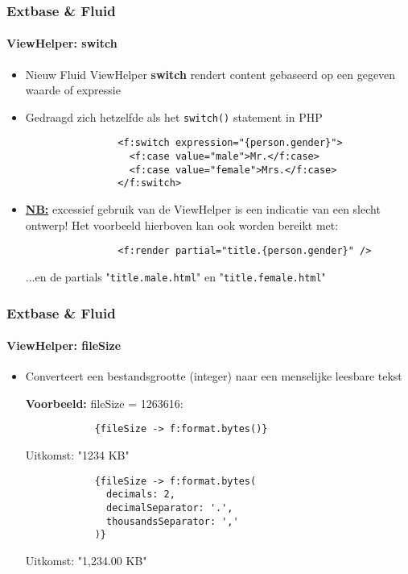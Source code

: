 \begin{frame}[fragile]
	\frametitle{Extbase \& Fluid}
	\framesubtitle{ViewHelper: switch}

	\lstset{
		basicstyle=\smaller\ttfamily
	}

	\begin{itemize}
		\item Nieuw Fluid ViewHelper \textbf{switch} rendert content gebaseerd op een gegeven waarde of expressie
		\item Gedraagd zich hetzelfde als het \texttt{switch()} statement in PHP

			\begin{lstlisting}
				<f:switch expression="{person.gender}">
				  <f:case value="male">Mr.</f:case>
				  <f:case value="female">Mrs.</f:case>
				</f:switch>
			\end{lstlisting}

		\item \textbf{\underline{NB:}} excessief gebruik van de ViewHelper is een indicatie van een slecht ontwerp! Het voorbeeld hierboven kan ook worden bereikt met:

			\begin{lstlisting}
				<f:render partial="title.{person.gender}" />
			\end{lstlisting}

			...en de partials "\texttt{title.male.html}" en "\texttt{title.female.html}"

	\end{itemize}

\end{frame}


\begin{frame}[fragile]
	\frametitle{Extbase \& Fluid}
	\framesubtitle{ViewHelper: fileSize}

	\lstset{
		basicstyle=\smaller\ttfamily
	}

	\begin{itemize}
		\item Converteert een bestandsgrootte (integer) naar een menselijke leesbare tekst\newline

			\smaller\textbf{Voorbeeld:} fileSize = 1263616:\normalsize
			\begin{lstlisting}
			{fileSize -> f:format.bytes()}
			\end{lstlisting}
			\smaller Uitkomst: "1234 KB"\normalsize\newline
			\begin{lstlisting}
			{fileSize -> f:format.bytes(
			  decimals: 2,
			  decimalSeparator: '.',
			  thousandsSeparator: ','
			)}
			\end{lstlisting}
			\smaller Uitkomst: "1,234.00 KB"\normalsize

	\end{itemize}

\end{frame}

